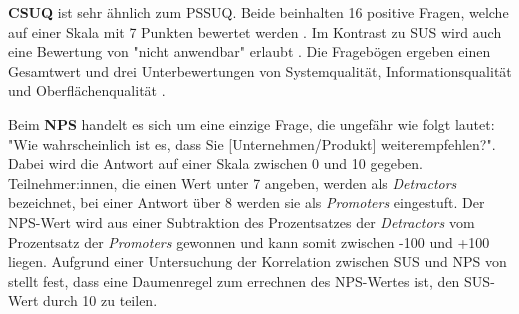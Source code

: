 \vspace{\baselineskip}

\textbf{\ac{CSUQ}} ist sehr ähnlich zum \ac{PSSUQ}. Beide beinhalten 16 positive Fragen, welche auf einer Skala mit 7 Punkten bewertet werden \parencite{barnumUsabilityTesting2021}. Im Kontrast zu \ac{SUS} wird auch eine Bewertung von "nicht anwendbar" erlaubt \parencite{barnumUsabilityTesting2021}. Die Fragebögen ergeben einen Gesamtwert und drei Unterbewertungen von Systemqualität, Informationsqualität und Oberflächenqualität \parencite{lewisIBMComputer1995}.

\vspace{\baselineskip}

Beim \textbf{\ac{NPS}} handelt es sich um eine einzige Frage, die ungefähr wie folgt lautet: "Wie wahrscheinlich ist es, dass Sie [Unternehmen/Produkt] weiterempfehlen?". Dabei wird die Antwort auf einer Skala zwischen 0 und 10 gegeben. Teilnehmer:innen, die einen Wert unter 7 angeben, werden als \textit{Detractors} bezeichnet, bei einer Antwort über 8 werden sie als \textit{Promoters} eingestuft. Der \ac{NPS}-Wert wird aus einer Subtraktion des Prozentsatzes der \textit{Detractors} vom Prozentsatz der \textit{Promoters} gewonnen und kann somit zwischen -100 und +100 liegen. Aufgrund einer Untersuchung der Korrelation zwischen \ac{SUS} und \ac{NPS} von \textcite{sauroDoesBetter2010} stellt \textcite{barnumUsabilityTesting2021} fest, dass eine Daumenregel zum errechnen des \ac{NPS}-Wertes ist, den \ac{SUS}-Wert durch 10 zu teilen.
